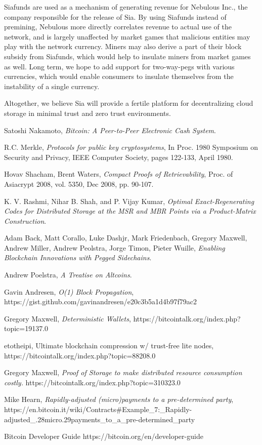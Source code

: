 \documentclass[twocolumn]{article}
\begin{document}
Siafunds are used as a mechanism of generating revenue for Nebulous Inc., the company responsible for the release of Sia.
By using Siafunds instead of premining, Nebulous more directly correlates revenue to actual use of the network, and is largely unaffected by market games that malicious entities may play with the network currency.
Miners may also derive a part of their block subsidy from Siafunds, which would help to insulate miners from market games as well.
Long term, we hope to add support for two-way-pegs with various currencies, which would enable consumers to insulate themselves from the instability of a single currency.

Altogether, we believe Sia will provide a fertile platform for decentralizing cloud storage in minimal trust and zero trust environments.

\onecolumn
\begin{thebibliography}{9}

	Satoshi Nakamoto,
	\emph{Bitcoin: A Peer-to-Peer Electronic Cash System}.

	R.C. Merkle,
	\emph{Protocols for public key cryptosystems},
	In Proc. 1980 Symposium on Security and	Privacy,
	IEEE Computer Society, pages 122-133, April 1980.

	Hovav Shacham, Brent Waters,
	\emph{Compact Proofs of Retrievability},
	Proc. of Asiacrypt 2008, vol. 5350, Dec 2008, pp. 90-107.

	K. V. Rashmi, Nihar B. Shah, and P. Vijay Kumar,
	\emph{Optimal Exact-Regenerating Codes for Distributed Storage at the MSR and MBR Points via a Product-Matrix Construction}.

	Adam Back, Matt Corallo, Luke Dashjr, Mark Friedenbach, Gregory Maxwell, Andrew Miller, Andrew Peolstra, Jorge Timon, Pieter Wuille,
	\emph{Enabling Blockchain Innovations with Pegged Sidechains}.

	Andrew Poelstra,
	\emph{A Treatise on Altcoins}.

	Gavin Andresen,
	\emph{O(1) Block Propagation},
	https://gist.github.com/gavinandresen/e20c3b5a1d4b97f79ac2

	Gregory Maxwell,
	\emph{Deterministic Wallets},
	https://bitcointalk.org/index.php?topic=19137.0

	etotheipi,
	Ultimate blockchain compression w/ trust-free lite nodes, \newline
	https://bitcointalk.org/index.php?topic=88208.0

	Gregory Maxwell,
	\emph{Proof of Storage to make distributed resource consumption costly.}
	https://bitcointalk.org/index.php?topic=310323.0

	Mike Hearn,
	\emph{Rapidly-adjusted (micro)payments to a pre-determined party},\newline
	https://en.bitcoin.it/wiki/Contracts\#Example\_7:\_Rapidly-adjusted\_.28micro.29payments\_to\_a\_pre-determined\_party

	Bitcoin Developer Guide
	https://bitcoin.org/en/developer-guide


\end{thebibliography}
\end{document}
